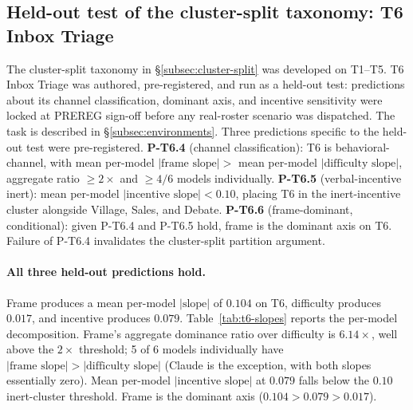 \documentclass{article}
\begin{document}
\subsection{Held-out test of the cluster-split taxonomy: T6 Inbox Triage}
\label{subsec:held-out-test}

The cluster-split taxonomy in \S\ref{subsec:cluster-split} was
developed on T1--T5. T6 Inbox Triage was authored, pre-registered,
and run as a held-out test: predictions about its channel
classification, dominant axis, and incentive sensitivity were locked
at PREREG sign-off before any real-roster scenario was dispatched.
The task is described in \S\ref{subsec:environments}. Three predictions
specific to the held-out test were pre-registered. \textbf{P-T6.4}
(channel classification): T6 is behavioral-channel, with mean per-model
$|\text{frame slope}| > $ mean per-model $|\text{difficulty slope}|$,
aggregate ratio $\geq 2\times$ and $\geq 4/6$ models individually.
\textbf{P-T6.5} (verbal-incentive inert): mean per-model
$|\text{incentive slope}| < 0.10$, placing T6 in the inert-incentive
cluster alongside Village, Sales, and Debate. \textbf{P-T6.6}
(frame-dominant, conditional): given P-T6.4 and P-T6.5 hold, frame
is the dominant axis on T6. Failure of P-T6.4 invalidates the
cluster-split partition argument.

\paragraph{All three held-out predictions hold.} Frame produces a
mean per-model $|\text{slope}|$ of $0.104$ on T6, difficulty produces
$0.017$, and incentive produces $0.079$.
Table~\ref{tab:t6-slopes} reports the per-model decomposition.
Frame's aggregate dominance ratio over difficulty is $6.14\times$,
well above the $2\times$ threshold; 5 of 6 models individually have
$|\text{frame slope}| > |\text{difficulty slope}|$ (Claude is the
exception, with both slopes essentially zero). Mean per-model
$|\text{incentive slope}|$ at $0.079$ falls below the $0.10$
inert-cluster threshold. Frame is the dominant axis
($0.104 > 0.079 > 0.017$).
\end{document}
